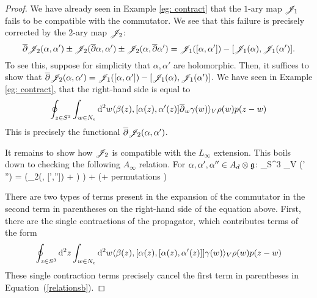 \begin{proof}
We have already seen in Example \ref{eg: contract} that the $1$-ary map $\mathscr J_1$ fails to be compatible with the commutator.
We see that this failure is precisely corrected by the $2$-ary map $\mathscr J_2$:
\[
\overline{\partial} \mathscr J_2(\alpha, \alpha') \pm \mathscr J_2(\overline{\partial} \alpha, \alpha') \pm \mathscr J_2(\alpha, \overline{\partial} \alpha') = \mathscr J_1([\alpha,\alpha']) - [\mathscr J_1(\alpha), \mathscr J_1(\alpha')] .
\] 
To see this, suppose for simplicity that $\alpha,\alpha'$ are holomorphic.
Then, it suffices to show that $\overline{\partial} \mathscr J_2(\alpha, \alpha') = \mathscr J_1([\alpha,\alpha']) - [\mathscr J_1(\alpha), \mathscr J_1(\alpha')]$.
We have seen in Example \ref{eg: contract}, that the right-hand side is equal to
\[
\oint_{z \in S^3} \int_{w \in N_{\epsilon}} {\rm d}^2 w  \langle\beta(z), [\alpha(z),\alpha'(z)] \overline{\partial}_w \gamma(w) \rangle_V \rho(w) p(z-w)
\]
This is precisely the functional $\overline{\partial} \mathscr J_2(\alpha,\alpha')$. 

It remains to show how $\mathscr J_2$ is compatible with the $L_\infty$ extension. 
This boils down to checking the following $A_\infty$ relation.
For $\alpha,\alpha',\alpha'' \in A_d \otimes \mathfrak g$:
\beqn\label{relationsb}
\oint_{S^3} \Tr_V \left(\alpha\wedge \partial \alpha' \wedge \partial \alpha''\right) = \displaystyle \left(\sJ_2(\alpha, [\alpha',\alpha'']) + ) \right) + \left( + \; {\rm permutations} \right)
\eeqn

There are two types of terms present in the expansion of the commutator in the second term in parentheses on the right-hand side of the equation above. 
First, there are the single contractions of the propagator, which contributes terms of the form
\[
\oint_{z \in S^3} {\rm d}^2 z \int_{w \in N_{\epsilon}} {\rm d}^2 w  \langle\beta(z), [\alpha(z), [\alpha(z),\alpha'(z)] ] \gamma(w) \rangle_V \rho(w) p(z-w) 
\]
These single contraction terms precisely cancel the first term in parentheses in Equation~(\ref{relationsb}). 


\end{proof}
